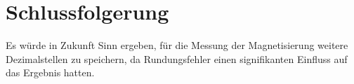 \newpage
\section{Schlussfolgerung}

  Es würde in Zukunft Sinn ergeben, für die Messung der Magnetisierung weitere Dezimalstellen zu speichern, da Rundungsfehler einen signifikanten Einfluss auf das Ergebnis hatten.
